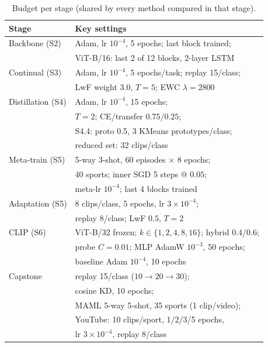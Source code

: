 \documentclass[conference]{IEEEtran}
\begin{document}
\begin{table}[t]
\centering
\caption{Budget per stage (shared by every method compared in that stage).}
\label{tab:hparams}
\renewcommand{\arraystretch}{1.12}
\begin{tabular}{ll}
\toprule
Stage & Key settings \\
\midrule
Backbone (S2)     & Adam, lr $10^{-4}$, 5 epochs; last block trained; \\
                  & ViT-B/16: last 2 of 12 blocks, 2-layer LSTM \\
Continual (S3)    & Adam, lr $10^{-4}$, 5 epochs/task; replay 15/class; \\
                  & LwF weight 3.0, $T{=}5$; EWC $\lambda{=}2800$ \\
Distillation (S4) & Adam, lr $10^{-4}$, 15 epochs; \\
                  & $T{=}2$; CE/transfer $0.75/0.25$; \\
                  & S4.4: proto 0.5, 3 KMeans prototypes/class; \\
                  & reduced set: 32 clips/class \\
Meta-train (S5)   & 5-way 3-shot, 60 episodes $\times$ 8 epochs; \\
                  & 40 sports; inner SGD 5 steps @ $0.05$; \\
                  & meta-lr $10^{-4}$; last 4 blocks trained \\
Adaptation (S5)   & 8 clips/class, 5 epochs, lr $3\!\times\!10^{-4}$; \\
                  & replay 8/class; LwF $0.5$, $T{=}2$ \\
CLIP (S6)         & ViT-B/32 frozen; $k\in\{1,2,4,8,16\}$; hybrid 0.4/0.6; \\
                  & probe $C{=}0.01$; MLP AdamW $10^{-3}$, 50 epochs; \\
                  & baseline Adam $10^{-4}$, 10 epochs \\
Capstone          & replay 15/class ($10\!\to\!20\!\to\!30$); \\
                  & cosine KD, 10 epochs; \\
                  & MAML 5-way 5-shot, 35 sports (1 clip/video); \\
                  & YouTube: 10 clips/sport, 1/2/3/5 epochs, \\
                  & lr $3\!\times\!10^{-4}$, replay 8/class \\
\bottomrule
\end{tabular}
\end{table}
\end{document}
